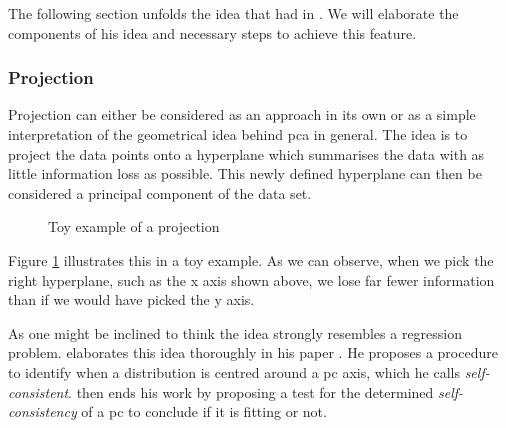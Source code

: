 The following section unfolds the idea that \citeauthor{hotelling1933analysis} had in \citeyear{hotelling1933analysis} \cite{hotelling1933analysis, deisenroth2020mathematics}. 
We will elaborate the components of his idea and necessary steps to achieve this feature.

\subsubsection{Projection}



Projection can either be considered as an approach in its own or as a simple interpretation of the geometrical idea behind \gls{pca} in general.
The idea is to project the data points onto a \gls{hyperplane} which summarises the data with as little information loss as possible.
This newly defined hyperplane can then be considered a principal component of the data set.


\renewcommand{\tikzscale}{0.4}
\begin{figure}[h]
	\centering
	
	\captionsetup{justification=centering}
	\vspace*{4mm}
	\caption{Toy example of a projection}
    \label{fig:projectionExample}
\end{figure}


Figure \ref{fig:projectionExample} illustrates this in a toy example.
As we can observe, when we pick the right \gls{hyperplane}, such as the x axis shown above, we lose far fewer information than if we would have picked the y axis.\bigskip


As one might be inclined to think the idea strongly resembles a regression problem. 
\citeauthor{tarpey1999self} elaborates this idea thoroughly in his paper  \cite{tarpey1999self}.
He proposes a procedure to identify when a distribution is centred around a \acrlong{pc} axis, which he calls \emph{self-consistent}.
\citeauthor{tarpey1999self} then ends his work by proposing a test for the determined \emph{self-consistency} of a \gls{pc} to conclude if it is fitting or not.






